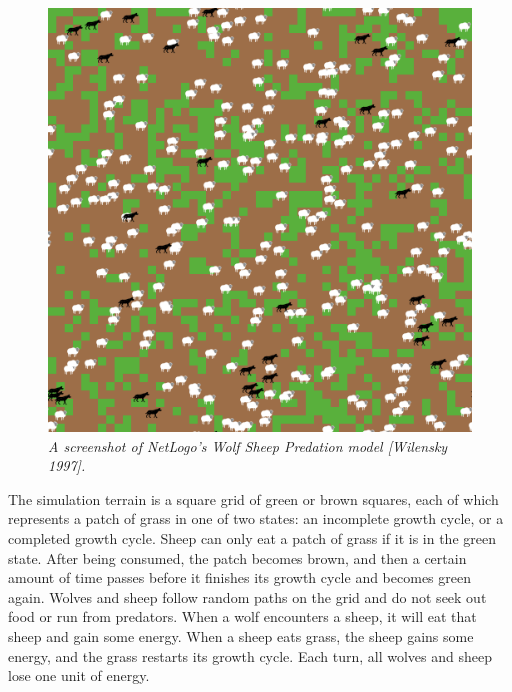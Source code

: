     \begin{figure}[H]
        \includegraphics[width=\linewidth]{./figures/netlogo_wsg}
        \caption{\textit{
           A screenshot of NetLogo's Wolf Sheep Predation model [Wilensky 1997].}}
        \label{fig:NetLogo WSP}
    \end{figure}

        The simulation terrain is a square grid of green or brown squares,
        each of which represents a patch of grass in one of two states:
        an incomplete growth cycle, or a completed growth cycle.
        Sheep can only eat a patch of grass if it is in the green state.
        After being consumed, the patch becomes brown, and then a certain amount
        of time passes before it finishes its growth cycle and becomes green again.
        Wolves and sheep follow random paths on the grid and do not seek out food or
        run from predators.
        When a wolf encounters a sheep, it will eat that sheep and gain some energy.
        When a sheep eats grass, the sheep gains some energy, and the grass restarts
        its growth cycle.
        Each turn, all wolves and sheep lose one unit of energy.